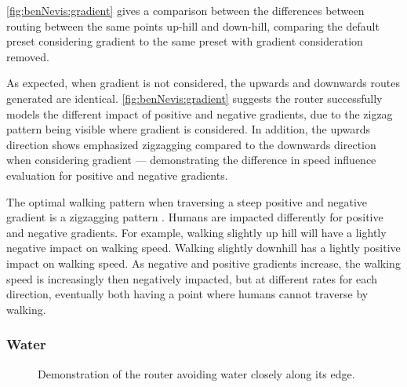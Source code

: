 \documentclass[12pt]{article}
\begin{document}
\autoref{fig:benNevis:gradient} gives a comparison between the differences between routing between the same points up-hill and down-hill, comparing the default preset considering gradient to the same preset with gradient consideration removed.

As expected, when gradient is not considered, the upwards and downwards routes generated are identical. \autoref{fig:benNevis:gradient} suggests the router successfully models the different impact of positive and negative gradients, due to the zigzag pattern being visible where gradient is considered. In addition, the upwards direction shows emphasized zigzagging compared to the downwards direction when considering gradient --- demonstrating the difference in speed influence evaluation for positive and negative gradients.

The optimal walking pattern when traversing a steep positive and negative gradient is a zigzagging pattern \autocite{horiuchi2015comparisons}. Humans are impacted differently for positive and negative gradients. For example, walking slightly up hill will have a lightly negative impact on walking speed. Walking slightly downhill has a lightly positive impact on walking speed. As negative and positive gradients increase, the walking speed is increasingly then negatively impacted, but at different rates for each direction, eventually both having a point where humans cannot traverse by walking.

\subsubsection{Water}

\begin{figure}[H]
  \centering
  \caption{Demonstration of the router avoiding water closely along its edge.}
  \label{fig:reservoir}
\end{figure}
\end{document}
